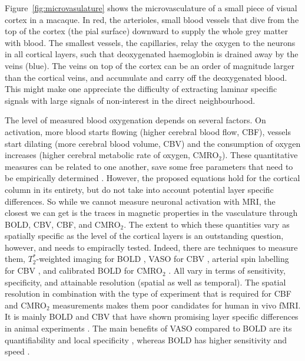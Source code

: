 Figure~\ref{fig:microvasulature} shows the microvasculature of a small piece of visual cortex in a macaque. In red, the arterioles, small blood vessels that dive from the top of the cortex (the pial surface) downward to supply the whole grey matter with blood. The smallest vessels, the capillaries, relay the oxygen to the neurons in all cortical layers, such that deoxygenated haemoglobin is drained away by the veins (blue). The veins on top of the cortex can be an order of magnitude larger than the cortical veins, and accumulate and carry off the deoxygenated blood. This might make one appreciate the difficulty of extracting laminar specific signals with large signals of non-interest in the direct neighbourhood.


The level of measured blood oxygenation depends on several factors. On activation, more blood starts flowing (higher cerebral blood flow, CBF), vessels start dilating (more cerebral blood volume, CBV) and the consumption of oxygen increases (higher cerebral metabolic rate of oxygen, CMRO$_{2}$). These quantitative measures can be related to one another, save some free parameters that need to be empirically determined \cite{Davis1997}. However, the proposed equations hold for the cortical column in its entirety, but do not take into account potential layer specific differences. So while we cannot measure neuronal activation with MRI, the closest we can get is the traces in magnetic properties in the vasculature through BOLD, CBV, CBF, and CMRO$_{2}$. The extent to which these quantities vary as spatially specific as the level of the cortical layers is an outstanding question, however, and needs to empiraclly tested. Indeed, there are techniques to measure them, $T_2^*$-weighted imaging for BOLD \cite{Norris2006}, VASO for CBV \cite{Huber2018}, arterial spin labelling for CBV \cite{Grade2015}, and calibrated BOLD for CMRO$_{2}$ \cite{Blockley2013}. All vary in terms of sensitivity, specificity, and attainable resolution (spatial as well as temporal). The spatial resolution in combination with the type of experiment that is required for CBF and CMRO$_2$ measurements makes them poor candidates for human in vivo fMRI. It is mainly BOLD and CBV that have shown promising layer specific differences in animal experiments \cite{Lu2004,Zhao2006,Jin2008,Goense2012}. The main benefits of VASO compared to BOLD are its quantifiability \cite{Lu2003} and local specificity \cite{Jin2006}, whereas BOLD has higher sensitivity and speed \cite{Huber2018}.

